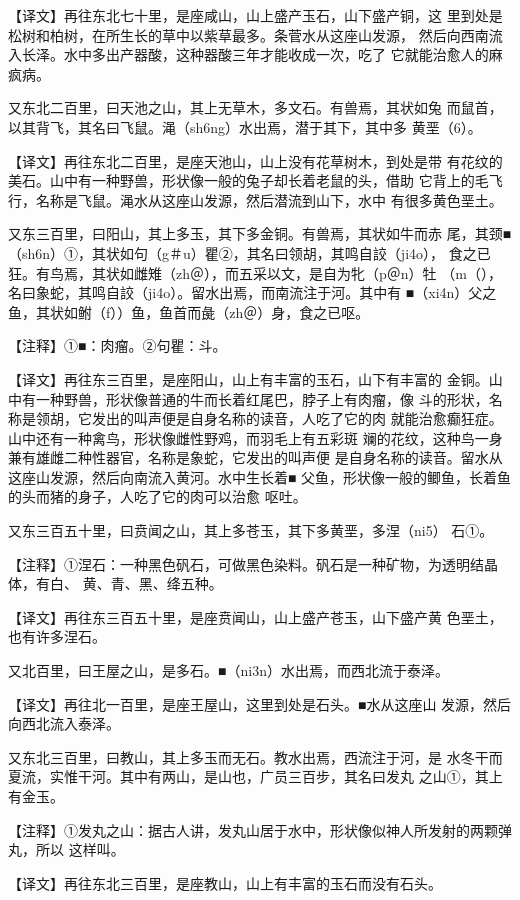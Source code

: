 \documentclass[a4paper,12pt,UTF8,twoside]{ctexbook}
\begin{document}
【译文】再往东北七十里，是座咸山，山上盛产玉石，山下盛产铜，这 里到处是松树和柏树，在所生长的草中以紫草最多。条菅水从这座山发源， 然后向西南流入长泽。水中多出产器酸，这种器酸三年才能收成一次，吃了 它就能治愈人的麻疯病。

又东北二百里，曰天池之山，其上无草木，多文石。有兽焉，其状如兔 而鼠首，以其背飞，其名曰飞鼠。渑（sh6ng）水出焉，潜于其下，其中多 黄垩（6）。

【译文】再往东北二百里，是座天池山，山上没有花草树木，到处是带 有花纹的美石。山中有一种野兽，形状像一般的兔子却长着老鼠的头，借助 它背上的毛飞行，名称是飞鼠。渑水从这座山发源，然后潜流到山下，水中 有很多黄色垩土。

又东三百里，曰阳山，其上多玉，其下多金铜。有兽焉，其状如牛而赤 尾，其颈■（sh6n）①，其状如句（g＃u）瞿②，其名曰领胡，其鸣自詨（ji4o）， 食之已狂。有鸟焉，其状如雌雉（zh＠），而五采以文，是自为牝（p＠n）牡 （m（），名曰象蛇，其鸣自詨（ji4o）。留水出焉，而南流注于河。其中有 ■（xi4n）父之鱼，其状如鲋（f））鱼，鱼首而彘（zh＠）身，食之已呕。

【注释】①■：肉瘤。②句瞿：斗。

【译文】再往东三百里，是座阳山，山上有丰富的玉石，山下有丰富的 金铜。山中有一种野兽，形状像普通的牛而长着红尾巴，脖子上有肉瘤，像 斗的形状，名称是领胡，它发出的叫声便是自身名称的读音，人吃了它的肉 就能治愈癫狂症。山中还有一种禽鸟，形状像雌性野鸡，而羽毛上有五彩斑 斓的花纹，这种鸟一身兼有雄雌二种性器官，名称是象蛇，它发出的叫声便 是自身名称的读音。留水从这座山发源，然后向南流入黄河。水中生长着■ 父鱼，形状像一般的鲫鱼，长着鱼的头而猪的身子，人吃了它的肉可以治愈 呕吐。

又东三百五十里，曰贲闻之山，其上多苍玉，其下多黄垩，多涅（ni5） 石①。

【注释】①涅石：一种黑色矾石，可做黑色染料。矾石是一种矿物，为透明结晶体，有白、 黄、青、黑、绛五种。

【译文】再往东三百五十里，是座贲闻山，山上盛产苍玉，山下盛产黄 色垩土，也有许多涅石。

又北百里，曰王屋之山，是多石。■（ni3n）水出焉，而西北流于泰泽。

【译文】再往北一百里，是座王屋山，这里到处是石头。■水从这座山 发源，然后向西北流入泰泽。

又东北三百里，曰教山，其上多玉而无石。教水出焉，西流注于河，是 水冬干而夏流，实惟干河。其中有两山，是山也，广员三百步，其名曰发丸 之山①，其上有金玉。

【注释】①发丸之山：据古人讲，发丸山居于水中，形状像似神人所发射的两颗弹丸，所以 这样叫。

【译文】再往东北三百里，是座教山，山上有丰富的玉石而没有石头。
\end{document}
